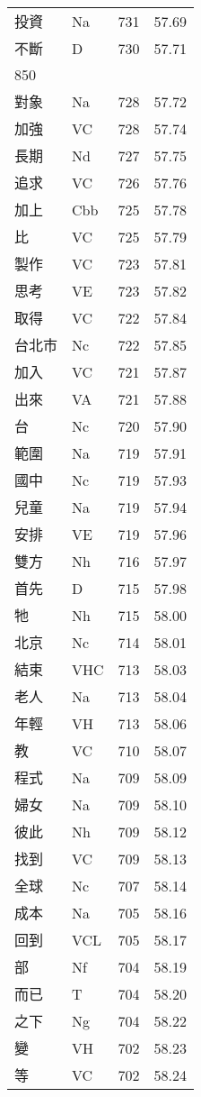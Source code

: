 \documentclass[twocolumn]{book}
\begin{document}
\begin{supertabular}{llrr}
投資 & Na & 731 &  57.69\\
不斷 & D & 730 &  57.71\\
850\\
對象 & Na & 728 &  57.72\\
加強 & VC & 728 &  57.74\\
長期 & Nd & 727 &  57.75\\
追求 & VC & 726 &  57.76\\
加上 & Cbb & 725 &  57.78\\
比 & VC & 725 &  57.79\\
製作 & VC & 723 &  57.81\\
思考 & VE & 723 &  57.82\\
取得 & VC & 722 &  57.84\\
台北市 & Nc & 722 &  57.85\\
加入 & VC & 721 &  57.87\\
出來 & VA & 721 &  57.88\\
台 & Nc & 720 &  57.90\\
範圍 & Na & 719 &  57.91\\
國中 & Nc & 719 &  57.93\\
兒童 & Na & 719 &  57.94\\
安排 & VE & 719 &  57.96\\
雙方 & Nh & 716 &  57.97\\
首先 & D & 715 &  57.98\\
牠 & Nh & 715 &  58.00\\
北京 & Nc & 714 &  58.01\\
結束 & VHC & 713 &  58.03\\
老人 & Na & 713 &  58.04\\
年輕 & VH & 713 &  58.06\\
教 & VC & 710 &  58.07\\
程式 & Na & 709 &  58.09\\
婦女 & Na & 709 &  58.10\\
彼此 & Nh & 709 &  58.12\\
找到 & VC & 709 &  58.13\\
全球 & Nc & 707 &  58.14\\
成本 & Na & 705 &  58.16\\
回到 & VCL & 705 &  58.17\\
部 & Nf & 704 &  58.19\\
而已 & T & 704 &  58.20\\
之下 & Ng & 704 &  58.22\\
變 & VH & 702 &  58.23\\
等 & VC & 702 &  58.24\\

\end{supertabular}
\end{document}
